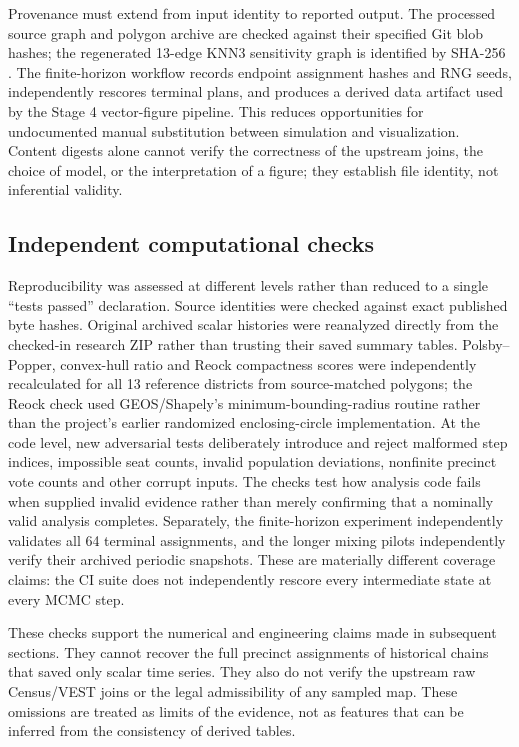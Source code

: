 \documentclass[
  10pt,
]{article}
\begin{document}
Provenance must extend from input identity to reported output. The
processed source graph and polygon archive are checked against their
specified Git blob hashes; the regenerated 13-edge KNN3 sensitivity
graph is identified by SHA-256
\texttt{}.
The finite-horizon workflow records endpoint assignment hashes and RNG
seeds, independently rescores terminal plans, and produces a derived
data artifact used by the Stage 4 vector-figure pipeline. This reduces
opportunities for undocumented manual substitution between simulation
and visualization. Content digests alone cannot verify the correctness
of the upstream joins, the choice of model, or the interpretation of a
figure; they establish file identity, not inferential validity.

\hypertarget{independent-computational-checks}{%
\subsection{Independent computational
checks}\label{independent-computational-checks}}

Reproducibility was assessed at different levels rather than reduced to
a single ``tests passed'' declaration. Source identities were checked
against exact published byte hashes. Original archived scalar histories
were reanalyzed directly from the checked-in research ZIP rather than
trusting their saved summary tables. Polsby--Popper, convex-hull ratio
and Reock compactness scores were independently recalculated for all 13
reference districts from source-matched polygons; the Reock check used
GEOS/Shapely's minimum-bounding-radius routine rather than the project's
earlier randomized enclosing-circle implementation. At the code level,
new adversarial tests deliberately introduce and reject malformed step
indices, impossible seat counts, invalid population deviations,
nonfinite precinct vote counts and other corrupt inputs. The checks test
how analysis code fails when supplied invalid evidence rather than
merely confirming that a nominally valid analysis completes. Separately,
the finite-horizon experiment independently validates all 64 terminal
assignments, and the longer mixing pilots independently verify their
archived periodic snapshots. These are materially different coverage
claims: the CI suite does not independently rescore every intermediate
state at every MCMC step.

These checks support the numerical and engineering claims made in
subsequent sections. They cannot recover the full precinct assignments
of historical chains that saved only scalar time series. They also do
not verify the upstream raw Census/VEST joins or the legal admissibility
of any sampled map. These omissions are treated as limits of the
evidence, not as features that can be inferred from the consistency of
derived tables.
\end{document}
